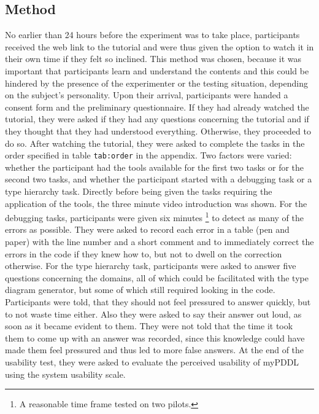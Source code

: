 \documentclass[a4paper,12pt]{report}
\newcommand{\mypddl}{\smallerft[0.8]{myPDDL}\xspace}
\newcommand\smallerft[2][0.85]{{\scalefont{#1}#2}}
\begin{document}
\subsection{Method}
\label{sec-5-2-3}

No earlier than 24 hours before the experiment was to take place,
participants received the web link to the tutorial and were thus given
the option to watch it in their own time if they felt so inclined.
This method was chosen, because it was important that participants
learn and understand the contents and this could be hindered by the
presence of the experimenter or the testing situation, depending on
the subject’s personality. Upon their arrival, participants were
handed a consent form and the preliminary questionnaire. If they had
already watched the tutorial, they were asked if they had any
questions concerning the tutorial and if they thought that they had
understood everything. Otherwise, they proceeded to do so. After
watching the tutorial, they were asked to complete the tasks in the
order specified in table \texttt{tab:order} in the appendix. Two factors were
varied: whether the participant had the tools available for the first
two tasks or for the second two tasks, and whether the participant
started with a debugging task or a type hierarchy task. Directly
before being given the tasks requiring the application of the tools,
the three minute video introduction was shown. For the debugging
tasks, participants were given six minutes \footnote{A reasonable time frame tested on two pilots.} to detect as many
of the errors as possible. They were asked to record each error in a
table (pen and paper) with the line number and a short comment and to
immediately correct the errors in the code if they knew how to, but
not to dwell on the correction otherwise. For the type hierarchy task,
participants were asked to answer five questions concerning the
domains, all of which could be facilitated with the type diagram
generator, but some of which still required looking in the code.
Participants were told, that they should not feel pressured to answer
quickly, but to not waste time either. Also they were asked to say
their answer out loud, as soon as it became evident to them. They were
not told that the time it took them to come up with an answer was
recorded, since this knowledge could have made them feel pressured and
thus led to more false answers. At the end of the usability test, they
were asked to evaluate the perceived usability of \mypddl using the
system usability scale.
\end{document}
